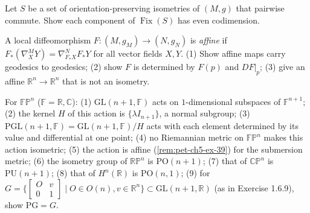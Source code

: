 \begin{remark}
  \label{rem:pet-ch5-ex-38}

  Let $S$ be a set of orientation-preserving isometries of $(M,g)$ that pairwise
  commute. Show each component of $\operatorname{Fix}(S)$ has even codimension.
\end{remark}

\begin{remark}
  \label{rem:pet-ch5-ex-39}

  A local diffeomorphism $F:(M,g_M)\to(N,g_N)$ is \emph{affine} if
  $F_*(\nabla^M_XY)=\nabla^N_{F_*X}F_*Y$ for all vector fields $X,Y$. (1) Show
  affine maps carry geodesics to geodesics; (2) show $F$ is determined by $F(p)$
  and $DF|_p$; (3) give an affine $\mathbb R^n\to\mathbb R^n$ that is not an
  isometry.
\end{remark}

\begin{remark}
  \label{rem:pet-ch5-ex-40}

  For $\mathbb{FP}^n$ ($\mathbb F=\mathbb R,\mathbb C$): (1) $\mathrm{GL}(n{+}1,
  \mathbb F)$ acts on $1$-dimensional subspaces of $\mathbb F^{n+1}$; (2) the
  kernel $H$ of this action is $\{\lambda I_{n+1}\}$, a normal subgroup; (3)
  $\mathrm{PGL}(n{+}1,\mathbb F)=\mathrm{GL}(n{+}1,\mathbb F)/H$ acts with each
  element determined by its value and differential at one point; (4) no
  Riemannian metric on $\mathbb{FP}^n$ makes this action isometric; (5) the action
  is affine (\cref{rem:pet-ch5-ex-39}) for the submersion metric; (6) the isometry
  group of $\mathbb{RP}^n$ is $\mathrm{PO}(n{+}1)$; (7) that of $\mathbb{CP}^n$ is
  $\mathrm{PU}(n{+}1)$; (8) that of $H^n(\mathbb R)$ is $\mathrm{PO}(n,1)$; (9) for
  $G=\{[\begin{smallmatrix}O&v\\0&1\end{smallmatrix}]\mid O\in O(n),v\in\mathbb R^n\}
  \subset\mathrm{GL}(n{+}1,\mathbb R)$ (as in Exercise 1.6.9), show $\mathrm{PG}=G$.
\end{remark}

